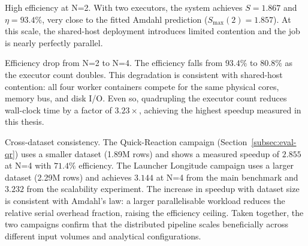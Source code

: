 High efficiency at N=2.
With two executors, the system achieves $S = 1.867$ and $\eta = 93.4\%$, very close to
the fitted Amdahl prediction ($S_{\max}(2)=1.857$).  At this scale, the shared-host
deployment introduces limited contention and the job is nearly perfectly parallel.

Efficiency drop from N=2 to N=4.
The efficiency falls from $93.4\%$ to $80.8\%$ as the executor count doubles.  This
degradation is consistent with shared-host contention: all four worker containers
compete for the same physical cores, memory bus, and disk I/O.  Even so, quadrupling
the executor count reduces wall-clock time by a factor of $3.23\times$, achieving the
highest speedup measured in this thesis.

Cross-dataset consistency.
The Quick-Reaction campaign (Section~\ref{subsec:eval-qr}) uses a smaller dataset
(1.89M rows) and shows a measured speedup of $2.855$ at N=4 with $71.4\%$ efficiency.
The Launcher Longitude campaign uses a larger dataset (2.29M rows) and achieves
$3.144$ at N=4 from the main benchmark and $3.232$ from the scalability experiment.
The increase in speedup with dataset size is consistent with Amdahl's law: a larger
parallelisable workload reduces the relative serial overhead fraction, raising the
efficiency ceiling.  Taken together, the two campaigns confirm that the distributed
pipeline scales beneficially across different input volumes and analytical configurations.
